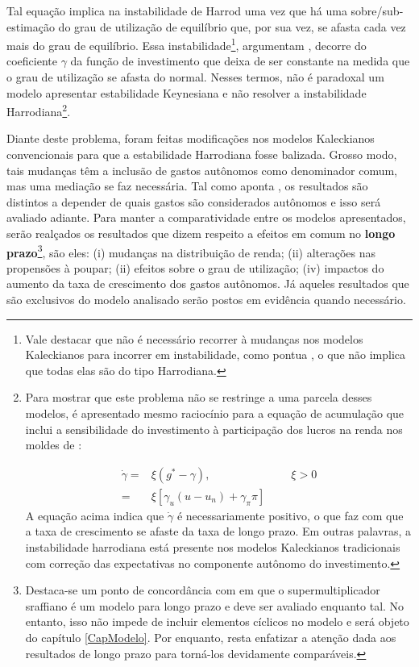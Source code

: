 Tal equação implica na instabilidade de Harrod uma vez que há uma sobre/sub-estimação do grau de utilização de equilíbrio que, por sua vez, se afasta cada vez mais do grau de equilíbrio. Essa instabilidade\footnote{Vale destacar que não é necessário recorrer à mudanças nos modelos Kaleckianos para incorrer em instabilidade, como pontua \textcite{dallery_kaleckian_2007}, o que não implica que todas elas são do tipo Harrodiana.}, argumentam \textcite{hein_harrodian_2012}, decorre do coeficiente $\gamma$ da função de investimento que deixa de ser constante na medida que o grau de utilização se afasta do normal. Nesses termos, não é paradoxal um modelo apresentar estabilidade Keynesiana e não resolver a instabilidade Harrodiana\footnote{Para mostrar que este problema não se restringe a uma parcela desses modelos, é apresentado mesmo raciocínio para a equação de acumulação que inclui a sensibilidade do investimento à participação dos lucros na renda nos moldes de \textcite{bhaduri_unemployment_1990}:

\begin{equation}
\label{KaleckiHarrod}
\begin{split}
    \dot \gamma = &\xi (g^* -\gamma), \hspace{3cm} \xi > 0\\
     = &\xi[\gamma_u (u-u_n) + \gamma_\pi\pi]
\end{split}
\end{equation}
A equação acima indica que $\dot \gamma$ é necessariamente positivo, o que faz com que a taxa de crescimento se afaste da taxa de longo prazo. Em outras palavras, a instabilidade harrodiana está presente nos modelos Kaleckianos tradicionais com correção das expectativas no componente autônomo do investimento.}. 

Diante deste problema, foram feitas modificações nos modelos Kaleckianos convencionais para que a estabilidade Harrodiana fosse balizada. Grosso modo, tais mudanças têm a inclusão de gastos autônomos como denominador comum, mas uma mediação se faz necessária. Tal como aponta \textcite[p.~3]{allain_macroeconomic_2014}, os resultados são distintos a depender de quais gastos são considerados autônomos e isso será avaliado adiante. Para manter a comparatividade entre os modelos apresentados, serão realçados os resultados que dizem respeito a efeitos em comum no \textbf{longo prazo}\footnote{Destaca-se um ponto de concordância com \textcite{nikiforos_comments_2018} em que o supermultiplicador sraffiano é um modelo para longo prazo e deve ser avaliado enquanto tal. No entanto, isso não impede de incluir elementos cíclicos no modelo e será objeto do capítulo \ref{CapModelo}. Por enquanto, resta enfatizar a atenção dada aos resultados de longo prazo para torná-los devidamente comparáveis.}, são eles: (i) mudanças na distribuição de renda; (ii) alterações nas propensões à poupar; (ii) efeitos sobre o grau de utilização; (iv) impactos do aumento da taxa de crescimento dos gastos autônomos. Já aqueles resultados que são exclusivos do modelo analisado serão postos em evidência quando necessário.

